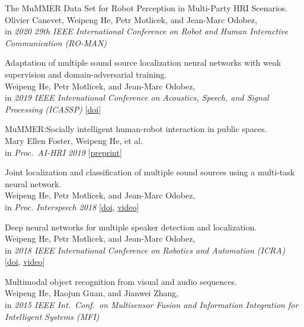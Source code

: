 \documentclass[a4paper,9pt]{extarticle} %
\begin{document}
\begin{enumerate}[label={[\arabic*]}]
  \item The MuMMER Data Set for Robot Perception in Multi-Party HRI Scenarios. \\
        Olivier Canevet, Weipeng He, Petr Motlicek, and Jean-Marc Odobez, \\
        in \textit{2020 29th IEEE International Conference on Robot and Human Interactive Communication (RO-MAN)}

  \item Adaptation of multiple sound source localization neural networks with weak supervision and domain-adversarial training. \\
        Weipeng He, Petr Motlicek, and Jean-Marc Odobez, \\
        in \textit{2019 IEEE International Conference on Acoustics, Speech, and Signal Processing (ICASSP)}
        [\href{https://doi.org/10.1109/ICASSP.2019.8682655}{doi}]

  \item MuMMER:\@ Socially intelligent human-robot interaction in public spaces. \\
        Mary Ellen Foster, Weipeng He, et al. \\
        in \textit{Proc.\ AI-HRI 2019}
        [\href{https://arxiv.org/abs/1909.06749}{preprint}]

  \item Joint localization and classification of multiple sound sources using a multi-task neural network. \\
        Weipeng He, Petr Motlicek, and Jean-Marc Odobez, \\
        in \textit{Proc. Interspeech 2018}
        [\href{http://doi.org/10.21437/Interspeech.2018-1269}{doi}, \href{https://www.youtube.com/watch?v=O7bQvg03RTc}{video}]

  \item Deep neural networks for multiple speaker detection and localization. \\
        Weipeng He, Petr Motlicek, and Jean-Marc Odobez, \\
        in \textit{2018 IEEE International Conference on Robotics and Automation (ICRA)}
        [\href{http://doi.org/10.1109/ICRA.2018.8461267}{doi}, \href{https://www.youtube.com/watch?v=_4EwuVlE_pU}{video}]

  \item Multimodal object recognition from visual and audio sequences. \\
        Weipeng He, Haojun Guan, and Jianwei Zhang, \\
        in \textit{2015 IEEE Int.\ Conf.\ on Multisensor Fusion and Information Integration for Intelligent Systems (MFI)}


\end{enumerate}
\end{document}
